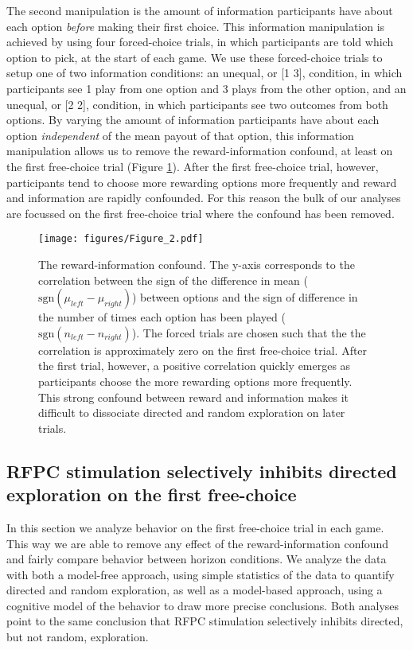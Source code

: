 \documentclass[12pt]{article}
\begin{document}
The second manipulation is the amount of information participants have about each option {\em before} making their first choice.  This information manipulation is achieved by using four forced-choice trials, in which participants are told which option to pick, at the start of each game. We use these forced-choice trials to setup one of two information conditions: an unequal, or [1 3], condition, in which participants see 1 play from one option and 3 plays from the other option, and an unequal, or [2 2], condition, in which participants see two outcomes from both options. By varying the amount of information participants have about each option {\em independent} of the mean payout of that option, this information manipulation allows us to remove the reward-information confound, at least on the first free-choice trial (Figure \ref{fig:confound}).  After the first free-choice trial, however, participants tend to choose more rewarding options more frequently and reward and information are rapidly confounded.  For this reason the bulk of our analyses are focussed on the first free-choice trial where the confound has been removed.



 
\begin{figure}[t]
\begin{center}
		\texttt{[image: figures/Figure\_2.pdf]}
\caption{The reward-information confound. The y-axis corresponds to the correlation between the sign of the difference in mean ($\mbox{sgn}(\mu_{left} - \mu_{right})$) between options and the sign of difference in the number of times each option has been played ($\mbox{sgn}(n_{left} - n_{right})$). The forced trials are chosen such that the the correlation is approximately zero on the first free-choice trial.  After the first trial, however, a positive correlation quickly emerges as participants choose the more rewarding options more frequently.  This strong confound between reward and information makes it difficult to dissociate directed and random exploration on later trials.
}
\label{fig:confound}
\end{center}
\end{figure}

\subsection*{RFPC stimulation selectively inhibits directed exploration on the first free-choice}

In this section we analyze behavior on the first free-choice trial in each game. This way we are able to remove any effect of the reward-information confound and fairly compare behavior between horizon conditions. We analyze the data with both a model-free approach, using simple statistics of the data to quantify directed and random exploration, as well as a model-based approach, using a cognitive model of the behavior to draw more precise conclusions. Both analyses point to the same conclusion that RFPC stimulation selectively inhibits directed, but not random, exploration.
\end{document}
